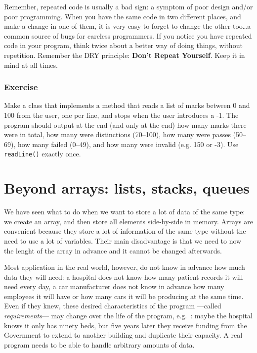 Remember, repeated code is usually a bad sign: a symptom of poor
design and/or poor programming. When you have the same code in two
different places, and make a change in one of them, it is very easy to
forget to change the other too\ldots a common source of bugs for
careless programmers. If you notice you have repeated code in your
program, think twice about a better way of doing things, without
repetition. Remember the DRY principle: \textbf{Don't Repeat
  Yourself}. Keep it in mind at all times.


\subsubsection*{Exercise}

Make a class that implements a method 
that reads a list of marks between 0 and 100 from the
user, one per line, and stops when the user introduces a -1. The
program should output at the end (and only at the end) how many marks
there were in total, how many were distinctions (70--100), how many
were passes (50--69), how many failed (0--49), and how many were
invalid (e.g. 150 or -3). Use \texttt{readLine()} exactly once.

\section{Beyond arrays: lists, stacks, queues}
\label{sec:beyond-arrays:-lists}

We have seen what to do when we want to store a lot of data of the
same type: we create an array, and then store all elements
side-by-side in memory. Arrays are convenient because they store a lot
of information of the same type without 
the need to use a lot of variables. Their main disadvantage is that we
need to now the lenght of the array in advance and it cannot be
changed afterwards. 

Most application in the real world, however, do not know in advance
how much data they will need: a hospital does not know how many
patient records it will need every day, a car manufacturer does not
know in advance how many employees it will have or how many cars it
will be producing at the same time. Even if they knew, these
desired characteristics of the program ---called
\emph{requirements}--- may change over the life of the program, e.g.~:
maybe the hospital knows it only has ninety beds, but five years later
they receive funding from the Government to extend to another building
and duplicate their capacity. A real program needs to be able to
handle arbitrary amounts of data. 

